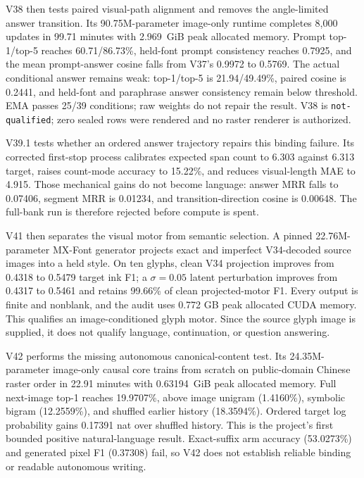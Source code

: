 \documentclass[11pt]{article}
\begin{document}
V38 then tests paired visual-path alignment and removes the angle-limited
answer transition. Its 90.75M-parameter image-only runtime completes 8,000
updates in 99.71 minutes with 2.969~GiB peak allocated memory. Prompt
top-1/top-5 reaches 60.71/86.73\%, held-font prompt consistency reaches
0.7925, and the mean prompt-answer cosine falls from V37's 0.9972 to 0.5769.
The actual conditional answer remains weak: top-1/top-5 is 21.94/49.49\%,
paired cosine is 0.2441, and held-font and paraphrase answer consistency remain
below threshold. EMA passes 25/39 conditions; raw weights do not repair the
result. V38 is \texttt{not-qualified}; zero sealed rows were rendered and no
raster renderer is authorized.

V39.1 tests whether an ordered answer trajectory repairs this binding failure.
Its corrected first-stop process calibrates expected span count to 6.303 against
6.313 target, raises count-mode accuracy to 15.22\%, and reduces visual-length
MAE to 4.915. Those mechanical gains do not become language: answer MRR falls
to 0.07406, segment MRR is 0.01234, and transition-direction cosine is 0.00648.
The full-bank run is therefore rejected before compute is spent.

V41 then separates the visual motor from semantic selection. A pinned
22.76M-parameter MX-Font generator projects exact and imperfect V34-decoded
source images into a held style. On ten glyphs, clean V34 projection improves
from 0.4318 to 0.5479 target ink F1; a $\sigma=0.05$ latent perturbation
improves from 0.4317 to 0.5461 and retains 99.66\% of clean projected-motor F1.
Every output is finite and nonblank, and the audit uses 0.772 GB peak allocated
CUDA memory. This qualifies an image-conditioned glyph motor. Since the source
glyph image is supplied, it does not qualify language, continuation, or
question answering.

V42 performs the missing autonomous canonical-content test. Its
24.35M-parameter image-only causal core trains from scratch on public-domain
Chinese raster order in 22.91 minutes with 0.63194~GiB peak allocated memory.
Full next-image top-1 reaches 19.9707\%, above image unigram (1.4160\%),
symbolic bigram (12.2559\%), and shuffled earlier history (18.3594\%). Ordered
target log probability gains 0.17391 nat over shuffled history. This is the
project's first bounded positive natural-language result. Exact-suffix arm
accuracy (53.0273\%) and generated pixel F1 (0.37308) fail, so V42 does not
establish reliable binding or readable autonomous writing.
\end{document}
